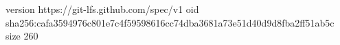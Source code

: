 version https://git-lfs.github.com/spec/v1
oid sha256:cafa3594976c801e7c4f59598616cc74dba3681a73e51d40d9d8fba2ff51ab5c
size 260
